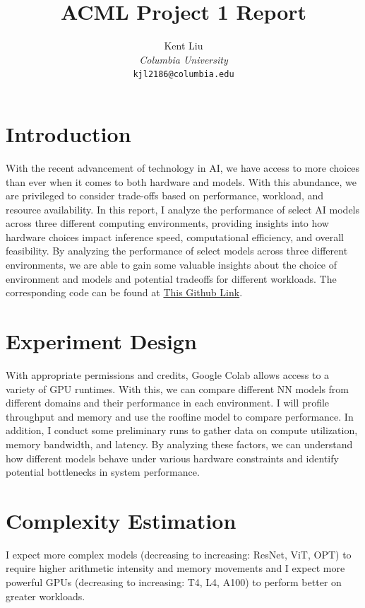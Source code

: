\documentclass[11pt]{article}
\title{ACML Project 1 Report}
\author{
    Kent Liu \\
    \textit{Columbia University} \\
    \texttt{kjl2186@columbia.edu}
}
\begin{document}
\maketitle

\section*{Introduction}
With the recent advancement of technology in AI, we have access to more choices than ever when it comes to both hardware and models.  With this abundance, we are privileged to consider trade-offs based on performance, workload, and resource availability. In this report, I analyze the performance of select AI models across three different computing environments, providing insights into how hardware choices impact inference speed, computational efficiency, and overall feasibility. By analyzing the performance of select models across three different environments, we are able to gain some valuable insights about the choice of environment and models and potential tradeoffs for different workloads. The corresponding code can be found at \href{https://github.com/kentjliu/acml-project1}{This Github Link}.


\section*{Experiment Design}
With appropriate permissions and credits, Google Colab allows access to a variety of GPU runtimes. With this, we can compare different NN models from different domains and their performance in each environment. I will profile throughput and memory and use the roofline model to compare performance. In addition, I conduct some preliminary runs to gather data on compute utilization, memory bandwidth, and latency. By analyzing these factors, we can understand how different models behave under various hardware constraints and identify potential bottlenecks in system performance.

\section*{Complexity Estimation}
I expect more complex models (decreasing to increasing: ResNet, ViT, OPT) to require higher arithmetic intensity and memory movements and I expect more powerful GPUs (decreasing to increasing: T4, L4, A100) to perform better on greater workloads.
\end{document}
